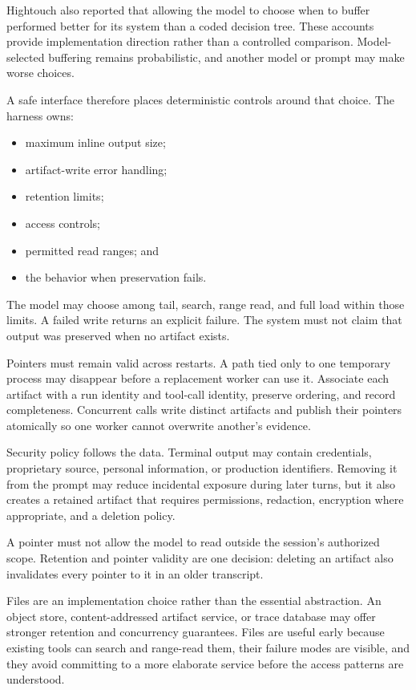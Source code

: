 Hightouch also reported that allowing the model to choose when to buffer performed better for its system than a coded decision tree. These accounts provide implementation direction rather than a controlled comparison. Model-selected buffering remains probabilistic, and another model or prompt may make worse choices.


A safe interface therefore places deterministic controls around that choice. The harness owns:

\begin{itemize}
\tightlist
\item
  maximum inline output size;
\item
  artifact-write error handling;
\item
  retention limits;
\item
  access controls;
\item
  permitted read ranges; and
\item
  the behavior when preservation fails.
\end{itemize}

The model may choose among tail, search, range read, and full load within those limits. A failed write returns an explicit failure. The system must not claim that output was preserved when no artifact exists.

Pointers must remain valid across restarts. A path tied only to one temporary process may disappear before a replacement worker can use it. Associate each artifact with a run identity and tool-call identity, preserve ordering, and record completeness. Concurrent calls write distinct artifacts and publish their pointers atomically so one worker cannot overwrite another's evidence.

Security policy follows the data. Terminal output may contain credentials, proprietary source, personal information, or production identifiers. Removing it from the prompt may reduce incidental exposure during later turns, but it also creates a retained artifact that requires permissions, redaction, encryption where appropriate, and a deletion policy.

A pointer must not allow the model to read outside the session's authorized scope. Retention and pointer validity are one decision: deleting an artifact also invalidates every pointer to it in an older transcript.

Files are an implementation choice rather than the essential abstraction. An object store, content-addressed artifact service, or trace database may offer stronger retention and concurrency guarantees. Files are useful early because existing tools can search and range-read them, their failure modes are visible, and they avoid committing to a more elaborate service before the access patterns are understood.

